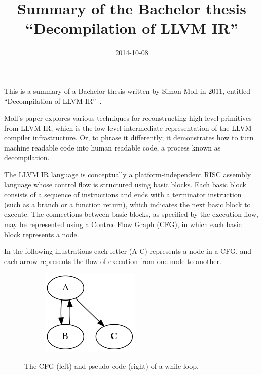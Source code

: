 \documentclass[12pt, a4paper]{article}
\title{Summary of the Bachelor thesis ``Decompilation of LLVM IR''}
\date{2014-10-08}
\begin{document}
\maketitle

This is a summary of a Bachelor thesis written by Simon Moll in 2011, entitled ``Decompilation of LLVM IR''~\cite{decomp_of_llvm}.

Moll's paper explores various techniques for reconstructing high-level primitives from LLVM IR, which is the low-level intermediate representation of the LLVM compiler infrastructure. Or, to phrase it differently; it demonstrates how to turn machine readable code into human readable code, a process known as decompilation.

The LLVM IR language is conceptually a platform-independent RISC assembly language whose control flow is structured using basic blocks. Each basic block consists of a sequence of instructions and ends with a terminator instruction (such as a branch or a function return), which indicates the next basic block to execute. The connections between basic blocks, as specified by the execution flow, may be represented using a Control Flow Graph (CFG), in which each basic block represents a node.

In the following illustrations each letter (A-C) represents a node in a CFG, and each arrow represents the flow of execution from one node to another.

\begin{figure}[H]
   \centering
   \begin{subfigure}[b]{0.2\textwidth}
      \includegraphics[width=\textwidth]{inc/pre_loop.png}
   \end{subfigure}
   \qquad
   \begin{subfigure}[b]{0.2\textwidth}
      
   \end{subfigure}
   \caption{The CFG (left) and pseudo-code (right) of a while-loop.}
\end{figure}
\end{document}
